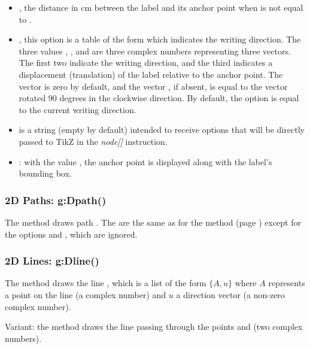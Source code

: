 \begin{itemize}
\begin{itemize}
    \item {}, the distance in cm between the label and its anchor point when  is not equal to .

    \item {}, this option is a table of the form  which indicates the writing direction. The three values ​​, , and  are three complex numbers representing three vectors. The first two indicate the writing direction, and the third indicates a displacement (translation) of the label relative to the anchor point. The vector  is zero by default, and the vector , if absent, is equal to the vector  rotated 90 degrees in the clockwise direction. By default, the  option is equal to the current writing direction.

    \item {} is a string (empty by default) intended to receive options that will be directly passed to TikZ in the \emph{node[]} instruction.

    \item {}: with the value \true, the anchor point is displayed along with the label's bounding box.
    \end{itemize}
\end{itemize}


\subsubsection{2D Paths: g:Dpath()}

The method  draws path . The  are the same as for the  method (page \pageref{dec:dpolyline}) except for the options  and , which are ignored.

\subsubsection{2D Lines: g:Dline()}

The method  draws the line , which is a list of the form $\{A,u\}$ where $A$ represents a point on the line (a complex number) and $u$ a direction vector (a non-zero complex number).

Variant: the method  draws the line passing through the points  and  (two complex numbers).

